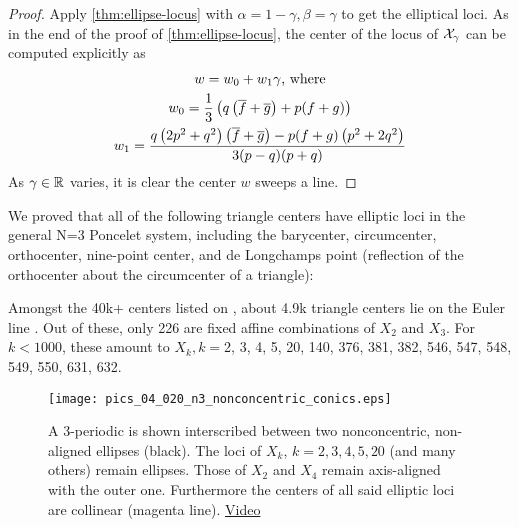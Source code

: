 \begin{proof}
Apply   \cref{thm:ellipse-locus} with $\alpha=1-\gamma, \beta=\gamma$ to get the elliptical loci. As in the end of the proof of  \cref{thm:ellipse-locus}, the center of the locus of $\mathcal{X}_\gamma$ can be computed explicitly as 
\begin{gather*}
    w=w_0+w_1 \gamma \text{, where}\\
    w_0=\frac{1}{3} \left(q \left(\overline{f}+\overline{g}\right)+p (f+g)\right)\\
    w_1=\frac{q \left(2 p^2+q^2\right) \left(\overline{f}+\overline{g}\right)-p (f+g) \left(p^2+2 q^2\right)}{3 (p-q) (p+q)}
\end{gather*}
As $\gamma\in\mathbb{R}$ varies, it is clear the center $w$ sweeps a line.
\end{proof}

We proved that all of the following triangle centers have elliptic loci in the general N=3 Poncelet system, including the barycenter, circumcenter, orthocenter, nine-point center, and de Longchamps point (reflection of the orthocenter  about the circumcenter of a triangle):

\begin{observation}
Amongst the 40k+ centers listed on \cite{etc}, about 4.9k triangle centers lie on the Euler line \cite{etc-central-lines}. Out of these, only 226 are fixed affine combinations of $X_2$ and $X_3$. For $k<1000$, these amount to $X_k,k=${\small 2, 3, 4, 5, 20, 140, 376, 381, 382, 546, 547, 548, 549, 550, 631, 
632}.
\label{obs:affine-euler-line}
\end{observation}

\begin{figure}
     \centering
     \texttt{[image: pics\_04\_020\_n3\_nonconcentric\_conics.eps]}
     \caption{A 3-periodic is shown interscribed between two nonconcentric, non-aligned ellipses (black). The loci of $X_k$, $k=2,3,4,5,20$ (and many others) remain ellipses. Those of $X_2$ and $X_4$ remain axis-aligned with the outer one. Furthermore the centers of all said elliptic loci are collinear (magenta line). \href{https://youtu.be/p1medAei_As}{Video}}
     \label{fig:nonconcentric-xns}
 \end{figure}
 
 
